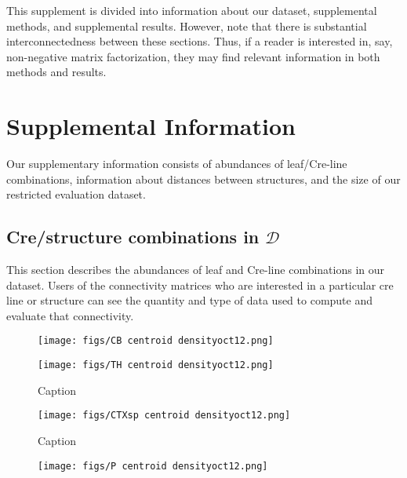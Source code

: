 This supplement is divided into information about our dataset, supplemental methods, and supplemental results.
However, note that there is substantial interconnectedness between these sections.
Thus, if a reader is interested in, say, non-negative matrix factorization, they may find relevant information in both methods and results.

\section{Supplemental Information}
\label{supp_sec:info}

Our supplementary information consists of abundances of leaf/Cre-line combinations, information about distances between structures, and the size of our restricted evaluation dataset.

\subsection{Cre/structure combinations in $\mathcal D$}
\label{supp_sec:data}

This section describes the abundances of leaf and Cre-line combinations in our dataset.
Users of the connectivity matrices who are interested in a particular cre line or structure can see the quantity and type of data used to compute and evaluate that connectivity.

\newpage

\begin{figure}[H]
    \centering
    \texttt{[image: figs/CB centroid densityoct12.png]}
    \label{fig:my_label}
\end{figure}
\newpage

\begin{figure}[H]
    \centering
    \texttt{[image: figs/TH centroid densityoct12.png]}
    \caption{Caption}
    \label{fig:my_label}
\end{figure}
\newpage

\begin{figure}[H]
    \centering
    \texttt{[image: figs/CTXsp centroid densityoct12.png]}
    \caption{Caption}
    \label{fig:my_label}
\end{figure}
\newpage

\begin{figure}[H]
    \centering
    \texttt{[image: figs/P centroid densityoct12.png]}
    \label{fig:my_label}
\end{figure}
\newpage

